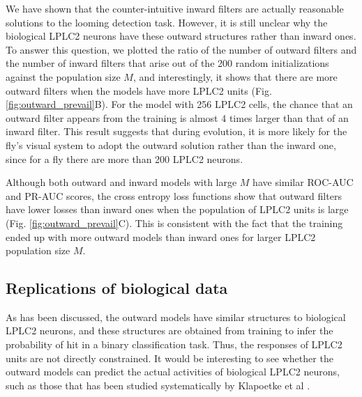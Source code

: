 \documentclass[pdftex,9pt,lineno]{elife}
\begin{document}
We have shown that the counter-intuitive inward filters are actually reasonable solutions to the looming detection task. However, it is still unclear why the biological LPLC2 neurons have these outward structures rather than inward ones. To answer this question, we plotted the ratio of the number of outward filters and the number of inward filters that arise out of the 200 random initializations against the population size $M$, and interestingly, it shows that there are more outward filters when the models have more LPLC2 units (Fig. \ref{fig:outward_prevail}B). For the model with 256 LPLC2 cells, the chance that an outward filter appears from the training is almost 4 times larger than that of an inward filter. This result suggests that during evolution, it is more likely for the fly's visual system to adopt the outward solution rather than the inward one, since for a fly there are more than 200 LPLC2 neurons.

Although both outward and inward models with large $M$ have similar ROC-AUC and PR-AUC scores,  the cross entropy loss functions show that outward filters have lower losses than inward ones when the population of LPLC2 units is large (Fig. \ref{fig:outward_prevail}C). This is consistent with the fact that the training ended up with more outward models than inward ones for larger LPLC2 population size $M$.


\subsection{Replications of biological data}




As has been discussed, the outward models have similar structures to biological LPLC2 neurons, and these structures are obtained from training to infer the probability of hit in a binary classification task. Thus, the responses of LPLC2 units are not directly constrained. It would be interesting to see whether the outward models can predict the actual activities of biological LPLC2 neurons, such as those that has been studied systematically by Klapoetke et al \cite{klapoetke2017ultra}.
\end{document}
